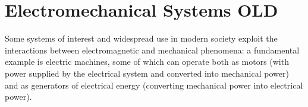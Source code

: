\documentclass[letterpaper,10pt,english]{jupyterBook}
\begin{document}
\section{Electromechanical Systems \sphinxhyphen{} OLD}
\label{\detokenize{ch/circuits-electromechanic-old:electromechanical-systems-old}}\label{\detokenize{ch/circuits-electromechanic-old:classical-electromagnetism-circuits-electromechanic}}\label{\detokenize{ch/circuits-electromechanic-old::doc}}
\sphinxAtStartPar
Some systems of interest and widespread use in modern society exploit the interactions between electromagnetic and mechanical phenomena: a fundamental example is electric machines, some of which can operate both as motors (with power supplied by the electrical system and converted into mechanical power) and as generators of electrical energy (converting mechanical power into electrical power).
\end{document}
